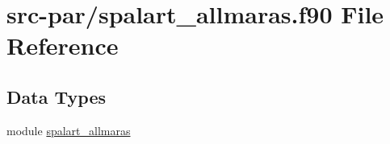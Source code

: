 \hypertarget{spalart__allmaras_8f90}{\section{src-\/par/spalart\-\_\-allmaras.f90 File Reference}
\label{spalart__allmaras_8f90}
}
\subsection*{Data Types}
\begin{DoxyCompactItemize}
\item 
module \hyperlink{classspalart__allmaras}{spalart\-\_\-allmaras}
\end{DoxyCompactItemize}
